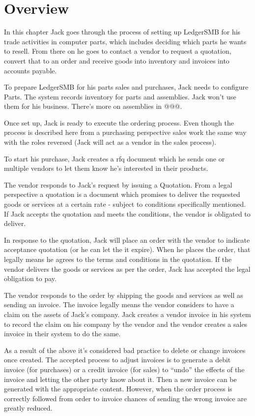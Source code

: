 \section{Overview}
\label{sec-stock-overview}

In this chapter Jack goes through the process of setting up LedgerSMB for his
trade activities in computer parts, which includes deciding which parts he wants to
resell. From there on he goes to contact a vendor to request a quotation, convert that
to an order and receive goods into inventory and invoices into accounts payable.

To prepare LedgerSMB for his parts sales and purchases, Jack needs to configure Parts.
The system records inventory for parts and assemblies. Jack won't use them for his
business. There's more on assemblies in @@@.

Once set up, Jack is ready to execute the ordering process. Even though the process
is described here from a purchasing perspective sales work the same way with the roles
reversed (Jack will act as a vendor in the sales process).

To start his purchase, Jack creates a \gls{rfq} document which
he sends one or multiple vendors to let them know he's interested in their products.

The vendor responds to Jack's request by issuing a Quotation. From a legal perspective
a quotation is a document which promises to deliver the requested goods or services at a
certain rate - subject to conditions specifically mentioned. If Jack accepts the quotation
and meets the conditions, the vendor is obligated to deliver.

In response to the quotation, Jack will place an order with the vendor to indicate
acceptance quotation (or he can let the
it expire). When he places the order, that legally means he agrees to the terms
and conditions in the quotation. If the vendor delivers the goods or services as per the
order, Jack has accepted the legal obligation to pay.

The vendor responds to the order by shipping the goods and services as well
as sending an invoice. The invoice legally means the vendor considers to have a claim on the assets
of Jack's company. Jack creates a vendor invoice in his system to record the claim on his
company by the vendor and the vendor creates a sales invoice in their system to do the same.

As a result of the above it's considered bad practice to delete or change invoices once
created. The accepted process to adjust invoices is to generate a debit invoice (for purchases)
or a credit invoice (for sales) to ``undo'' the effects of the invoice and letting the other party
know about it. Then a new invoice can be generated with the appropriate content. However,
when the order process is correctly followed from order to invoice chances of sending the wrong
invoice are greatly reduced.

